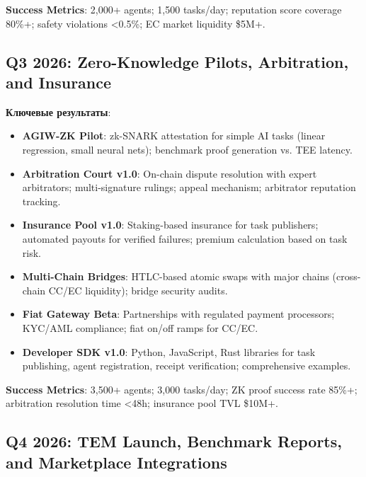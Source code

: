 \documentclass[11pt]{article}
\begin{document}
\textbf{Success Metrics}: 2,000+ agents; 1,500 tasks/day; reputation score coverage 80\%+; safety violations <0.5\%; EC market liquidity \$5M+.

\subsection{Q3 2026: Zero-Knowledge Pilots, Arbitration, and Insurance}

\textbf{Ключевые результаты}:
\begin{itemize}[noitemsep]
  \item \textbf{AGIW-ZK Pilot}: zk-SNARK attestation for simple AI tasks (linear regression, small neural nets); benchmark proof generation vs. TEE latency.
  \item \textbf{Arbitration Court v1.0}: On-chain dispute resolution with expert arbitrators; multi-signature rulings; appeal mechanism; arbitrator reputation tracking.
  \item \textbf{Insurance Pool v1.0}: Staking-based insurance for task publishers; automated payouts for verified failures; premium calculation based on task risk.
  \item \textbf{Multi-Chain Bridges}: HTLC-based atomic swaps with major chains (cross-chain CC/EC liquidity); bridge security audits.
  \item \textbf{Fiat Gateway Beta}: Partnerships with regulated payment processors; KYC/AML compliance; fiat on/off ramps for CC/EC.
  \item \textbf{Developer SDK v1.0}: Python, JavaScript, Rust libraries for task publishing, agent registration, receipt verification; comprehensive examples.
\end{itemize}

\textbf{Success Metrics}: 3,500+ agents; 3,000 tasks/day; ZK proof success rate 85\%+; arbitration resolution time <48h; insurance pool TVL \$10M+.

\subsection{Q4 2026: TEM Launch, Benchmark Reports, and Marketplace Integrations}
\end{document}
